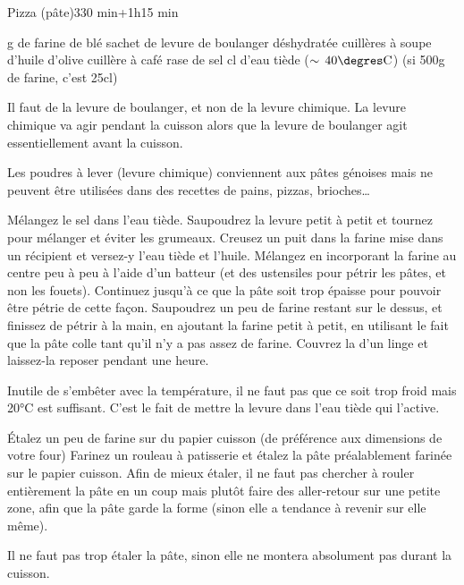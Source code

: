 \begin{recette}{Pizza (pâte)}{3}{30 min+1h}{15 min}
\begin{ingredients}
 g de farine de blé
 sachet de levure de boulanger déshydratée
 cuillères à soupe d’huile d’olive
 cuillère à café rase de sel
 cl d’eau tiède ($\sim\unit{40\degres C}$) (si 500g de farine, c'est 25cl)

\end{ingredients}
\begin{remarque}
Il faut de la levure de boulanger, et non de la levure chimique. La levure chimique va agir pendant la cuisson alors que la levure de boulanger agit essentiellement avant la cuisson. 

Les poudres à lever (levure chimique) conviennent aux pâtes génoises mais ne peuvent être utilisées dans des recettes de pains, pizzas, brioches\dots
\end{remarque}

\begin{preparation}
\etape Mélangez le sel dans l'eau tiède. Saupoudrez la levure petit à petit et tournez pour mélanger et éviter les grumeaux.
\etape Creusez un puit dans la farine mise dans un récipient et versez-y l'eau tiède et l'huile. 
\etape Mélangez en incorporant la farine au centre peu à peu à l'aide d'un batteur (et des ustensiles pour pétrir les pâtes, et non les fouets). Continuez jusqu'à ce que la pâte soit trop épaisse pour pouvoir être pétrie de cette façon.
\etape Saupoudrez un peu de farine restant sur le dessus, et finissez de pétrir à la main, en ajoutant la farine petit à petit, en utilisant le fait que la pâte colle tant qu'il n'y a pas assez de farine.
\etape Couvrez la d'un linge et laissez-la reposer pendant une heure. 
\begin{remarque}
Inutile de s'embêter avec la température, il ne faut pas que ce soit trop froid mais 20°C est suffisant. C'est le fait de mettre la levure dans l'eau tiède qui l'active.
\end{remarque}

\etape Étalez un peu de farine sur du papier cuisson (de préférence aux dimensions de votre four)
\etape Farinez un rouleau à patisserie et étalez la pâte préalablement farinée sur le papier cuisson. Afin de mieux étaler, il ne faut pas chercher à rouler entièrement la pâte en un coup mais plutôt faire des aller-retour sur une petite zone, afin que la pâte garde la forme (sinon elle a tendance à revenir sur elle même). 
\begin{remarque}
Il ne faut pas trop étaler la pâte, sinon elle ne montera absolument pas durant la cuisson.
\end{remarque}


\end{preparation}
\end{recette}
